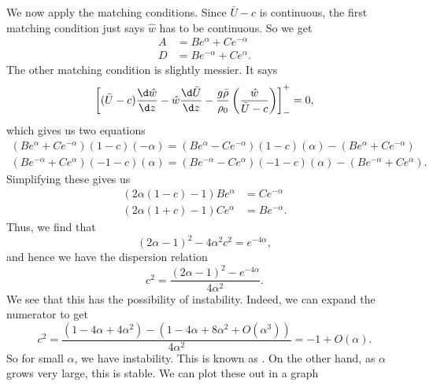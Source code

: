 \documentclass[a4paper]{article}
\begin{document}
We now apply the matching conditions. Since $\bar{U} - c$ is continuous, the first matching condition just says $\hat{w}$ has to be continuous. So we get
\begin{align*}
  A &= B e^\alpha + C e^{-\alpha}\\
  D &= B e^{-\alpha} + C e^{\alpha}.
\end{align*}
The other matching condition is slightly messier. It says
\[
  \left[(\bar{U} - c)\frac{\d \hat{w}}{\d z} - \hat{w} \frac{\d \bar{U}}{\d z} - \frac{g \bar{\rho}}{\rho_0} \left(\frac{\hat{w}}{\bar{U} - c}\right)\right]^+_- = 0,
\]
which gives us two equations
\begin{align*}
  (B e^\alpha + C e^{-\alpha}) (1 - c)(-\alpha) = (Be^\alpha - Ce^{-\alpha}) (1 - c)(\alpha) - (Be^\alpha + Ce^{-\alpha})\\
  (B e^{-\alpha} + C e^{\alpha}) (-1 - c)(\alpha) = (Be^{-\alpha} - Ce^{\alpha}) (-1 - c)(\alpha) - (Be^{-\alpha} + Ce^\alpha).
\end{align*}
Simplifying these gives us
\begin{align*}
  (2\alpha(1 - c) - 1) Be^\alpha &= Ce^{-\alpha}\\
  (2\alpha(1 + c) - 1) Ce^\alpha &= B e^{-\alpha}.
\end{align*}
Thus, we find that
\[
  (2\alpha - 1)^2 - 4\alpha^2 c^2 = e^{-4\alpha},
\]
and hence we have the dispersion relation
\[
  c^2 = \frac{(2\alpha - 1)^2 - e^{-4\alpha}}{4\alpha^2}.
\]
We see that this has the possibility of instability. Indeed, we can expand the numerator to get
\[
  c^2 = \frac{(1 - 4\alpha + 4\alpha^2) - (1 - 4\alpha + 8 \alpha^2 + O(\alpha^3))}{4\alpha^2} = -1 + O(\alpha).
\]
So for small $\alpha$, we have instability. This is known as . On the other hand, as $\alpha$ grows very large, this is stable. We can plot these out in a graph
\end{document}
